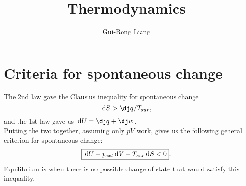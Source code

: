 \documentclass{article}
\title{Thermodynamics}
\author{Gui-Rong Liang}
\newcommand{\be}{\begin{equation}}
\newcommand{\ee}{\end{equation}}
\newcommand{\dif}{\,\mathrm{d}}
\renewcommand{\1}{\left}
\renewcommand{\2}{\right}
\begin{document}
\maketitle
\tableofcontents

\newpage

\section{Criteria for spontaneous change}
The 2nd law gave the Clausius inequality for spontaneous change
\be
\dif S>\dj q/T_{sur},
\ee
and the 1st law gave us $\dif U=\dj q+\dj w$.\\
Putting the two together, assuming only $pV$ work, gives us the following general criterion for spontaneous change:
\be
\fbox{$\dif U+p_{ext}\dif V-T_{sur}\dif S<0$}.
\ee
Equilibrium is when there is no possible change of state that would satisfy this inequality.
\end{document}
